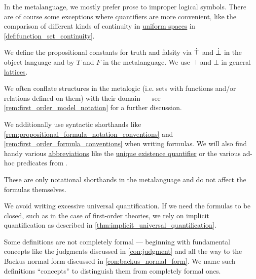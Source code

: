 \begin{remark}
\begin{thmenum}
    In the metalanguage, we mostly prefer prose to improper logical symbols. There are of course some exceptions where quantifiers are more convenient, like the comparison of different kinds of continuity in \hyperref[def:uniform_space]{uniform spaces} in \cref{def:function_set_continuity}.

     We define the propositional constants for truth and falsity via \( \dot{\top} \) and \( \dot{\bot} \) in the object language and by \( T \) and \( F \) in the metalanguage. We use \( \top \) and \( \bot \) in general \hyperref[def:lattice]{lattices}.

     We often conflate structures in the metalogic (i.e. sets with functions and/or relations defined on them) with their domain --- see \cref{rem:first_order_model_notation} for a further discussion.

     We additionally use syntactic shorthands like \cref{rem:propositional_formula_notation_conventions} and \cref{rem:first_order_formula_conventions} when writing formulas. We will also find handy various \hyperref[con:syntactic_abbreviation]{abbreviations} like the \hyperref[con:denotation/exists_unique]{unique existence quantifier} or the various ad-hoc predicates from .

    These are only notational shorthands in the metalanguage and do not affect the formulas themselves.

     We avoid writing excessive universal quantification. If we need the formulas to be closed, such as in the case of \hyperref[def:first_order_theory]{first-order theories}, we rely on implicit quantification as described in \cref{thm:implicit_universal_quantification}.

     Some definitions are not completely formal --- beginning with fundamental concepts like the judgments discussed in \cref{con:judgment} and all the way to the Backus normal form discussed in \cref{con:backus_normal_form}. We name such definitions \enquote{concepts} to distinguish them from completely formal ones.
  \end{thmenum}
\end{remark}
